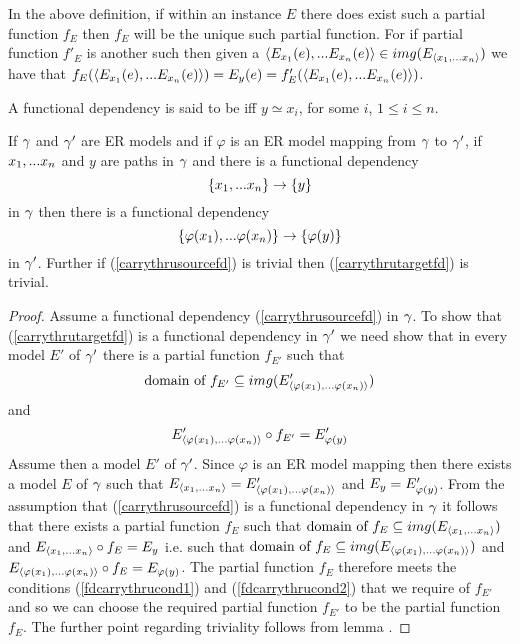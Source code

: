 \begin{remark}
In the above definition, if within an instance $E$ there does exist such a partial function $f_E$ then $f_E$ will be the unique such partial function. For if partial function $f'_E$ is another such then given a $\langle E_{x_1}(e),...E_{x_n}(e)\rangle \in img(E_{\langle x_1,...x_n\rangle})$
we have that $f_E(\langle E_{x_1}(e),...E_{x_n}(e)\rangle)=E_y(e)=f'_E(\langle E_{x_1}(e),...E_{x_n}(e)\rangle)$.
\end{remark}

\begin{definition}
A functional dependency  is said to be  iff $y\simeq x_i$, for some $i$, $1 \leq i \leq n$.
\end{definition}

\begin{lemma}
If $\gamma$ and $\gamma'$ are ER models and  if  $\varphi$ is an ER model mapping from $\gamma$  to $\gamma'$,  if $x_1,...x_n$ and $y$ are paths in $\gamma$
and there is a  functional dependency
\begin{equation}
\label{carrythrusourcefd}
\left\{x_1,...x_n\right\} \rightarrow \left\{y\right\}
\end{equation} 
in $\gamma$ then there is a functional dependency
\begin{equation}
\label{carrythrutargetfd}
\left\{\varphi(x_1),...\varphi(x_n)\right\} \rightarrow \left\{\varphi(y)\right\}
\end{equation}
in $\gamma'$.
Further if (\ref{carrythrusourcefd}) is trivial then (\ref{carrythrutargetfd}) is trivial.
\end{lemma}
\begin{proof}
Assume a functional dependency (\ref{carrythrusourcefd})  in $\gamma$. To show that (\ref{carrythrutargetfd}) is a functional dependency in $\gamma'$
we need show that in every model $E'$ 
of $\gamma'$ there is a partial function $f_{E'}$ such that
\begin{equation}
\label{fdcarrythrucond1}
\mbox{domain of }f_{E'} \subseteq img(E'_{\langle\varphi(x_1),...\varphi(x_n)\rangle})
\end{equation}
and
\begin{equation}
\label{fdcarrythrucond2}
E'_{\langle\varphi(x_1),...\varphi(x_n)\rangle} \circ f_{E'} = E'_{\varphi(y)}
\end{equation}
Assume then a model $E'$ of $\gamma'$. 
Since $\varphi$ is an ER model mapping then there exists a model $E$ of $\gamma$ such that 
$E_{\langle x_1,...x_n\rangle} = E'_{\langle\varphi(x_1),...\varphi(x_n)\rangle}$ and $E_y = E'_{\varphi(y)}$. From the assumption that (\ref{carrythrusourcefd})
is a functional dependency in $\gamma$ it follows that there exists a  partial function $f_E$ such that
$\mbox{domain of }f_{E} \subseteq img(E_{\langle x_1,...x_n\rangle})$
and
$E_{\langle x_1,...x_n\rangle} \circ f_{E} = E_y$ 
i.e. such that 
$\mbox{domain of }f_{E} \subseteq img(E_{\langle\varphi(x_1),...\varphi(x_n)\rangle})$
and
$E_{\langle\varphi(x_1),...\varphi(x_n)\rangle} \circ f_{E} = E_{\varphi(y)}$.  The partial function $f_E$ therefore 
meets the conditions (\ref{fdcarrythrucond1}) and (\ref{fdcarrythrucond2}) that
we require of $f_{E'}$ and so we can choose the required partial function
$f_{E'}$ to be the partial function $f_E$. 
The further point regarding triviality follows from lemma .
\end{proof}




